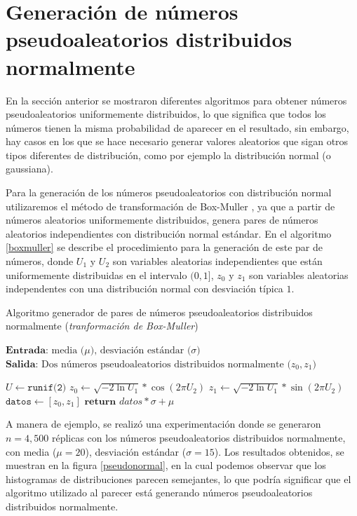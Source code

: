 \documentclass{article}
\begin{document}
\section{Generación de números pseudoaleatorios distribuidos normalmente}

En la sección anterior se mostraron diferentes algoritmos para obtener números pseudoaleatorios uniformemente distribuidos, lo que significa que todos los números tienen la misma probabilidad de aparecer en el resultado, sin embargo, hay casos en los que se hace necesario generar valores aleatorios que sigan otros tipos diferentes de distribución, como por ejemplo la distribución normal (o gaussiana). 

Para la generación de los números pseudoaleatorios con distribución normal utilizaremos el método de transformación de Box-Muller \cite{box}, ya que a partir de números aleatorios uniformemente distribuidos, genera pares de números aleatorios independientes con distribución normal estándar. En el algoritmo \ref{boxmuller} se describe el procedimiento para la generación de este par de números, donde $U_{1}$ y $U_{2}$ son variables aleatorias independientes que están uniformemente distribuidas en el intervalo $(0, 1]$, $z_{0}$ y
$z_{1}$ son variables aleatorias independentes con una distribución normal con desviación típica $1$.

\begin{algorithm}
	\caption{Algoritmo generador de pares de números pseudoaleatorios distribuidos normalmente (\emph{tranformación de Box-Muller})}
	\label{boxmuller}
	\SetAlgoLined
	\(\textbf{Entrada: } \text{media ($\mu$), desviación estándar ($\sigma$)}\)\;
	\(\textbf{Salida: } \text{Dos números pseudoaleatorios distribuidos normalmente ($z_{0}, z_{1}$)}\)\;

    \(U \leftarrow \texttt{runif(2)}\)\;
    \(z_{0} \leftarrow \sqrt{-2 \ln U_{1}} * \cos(2\pi U_{2})\)\;
    \(z_{1} \leftarrow \sqrt{-2 \ln U_{1}} * \sin(2\pi U_{2})\)\;
    \(\texttt{datos} \leftarrow [z_{0}, z_{1}] \)\;
    \(\textbf{return } datos * \sigma + \mu\)\;

\end{algorithm}

A manera de ejemplo, se realizó una experimentación donde se generaron $n=4,500$ réplicas con los números pseudoaleatorios distribuidos normalmente, con media ($\mu = 20$), desviación estándar ($\sigma = 15$). Los resultados obtenidos, se muestran en la figura \ref{pseudonormal}, en la cual podemos observar que los histogramas de distribuciones parecen semejantes, lo que podría significar que el algoritmo utilizado al parecer está generando números pseudoaleatorios distribuidos normalmente.
\end{document}
